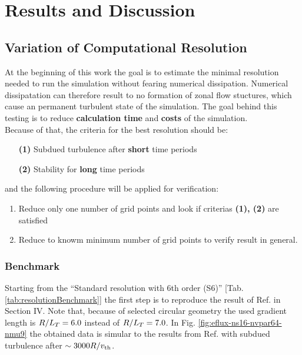 
\chapter{Results and Discussion}
\label{chap:results}
\thispagestyle{empty}
\newpage

\section{Variation of Computational Resolution}
\label{sec:variationsofresolution}

At the beginning of this work the goal is to estimate the minimal resolution needed to run the simulation without fearing numerical dissipation. Numerical dissipatation can therefore result to no formation of zonal flow stuctures, which cause an permanent turbulent state of the simulation. The goal behind this testing is to reduce \textbf{calculation time} and \textbf{costs} of the simulation. \\
Because of that, the criteria for the best resolution should be:
\begin{enumerate}
	\item[\textbf{(1)}] Subdued turbulence after \textbf{short} time periods
	\item[\textbf{(2)}] Stability for \textbf{long} time periods 
\end{enumerate}
and the following procedure will be applied for verification:
\begin{enumerate}
	\item Reduce only one number of grid points and look if criterias \textbf{(1), (2)} are satisfied
	\item Reduce to knowm minimum number of grid points to verify result in general.
\end{enumerate}


\subsection{Benchmark}
\label{sub:benchmark}

Starting from the \enquote{Standard resolution with 6th order (S6)} [Tab. \ref{tab:resolutionBenchmark}] the first step is to reproduce the result of Ref.  in Section IV. Note that, because of selected circular geometry the used gradient length is $R/L_T = 6.0$ instead of $R/L_T = 7.0$. In Fig. \ref{fig:eflux-ns16-nvpar64-nmu9} the obtained data is simular to the results from Ref.  with subdued turbulence after $\sim 3000 R/v_{\mathrm{th}}$. 

